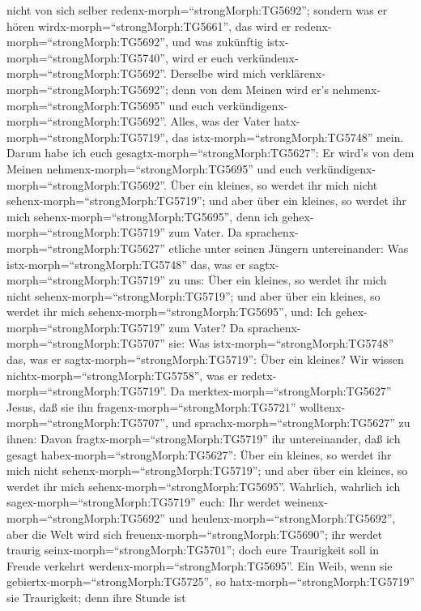 nicht von sich selber redenx-morph=``strongMorph:TG5692''; sondern was
er hören wirdx-morph=``strongMorph:TG5661'', das wird er
redenx-morph=``strongMorph:TG5692'', und was zukünftig
istx-morph=``strongMorph:TG5740'', wird er euch
verkündenx-morph=``strongMorph:TG5692''.  Derselbe wird
mich verklärenx-morph=``strongMorph:TG5692''; denn von dem Meinen wird
er's nehmenx-morph=``strongMorph:TG5695'' und euch
verkündigenx-morph=``strongMorph:TG5692''.  Alles, was der
Vater hatx-morph=``strongMorph:TG5719'', das
istx-morph=``strongMorph:TG5748'' mein. Darum habe ich euch
gesagtx-morph=``strongMorph:TG5627'': Er wird's von dem Meinen
nehmenx-morph=``strongMorph:TG5695'' und euch
verkündigenx-morph=``strongMorph:TG5692''.  Über ein
kleines, so werdet ihr mich nicht sehenx-morph=``strongMorph:TG5719'';
und aber über ein kleines, so werdet ihr mich
sehenx-morph=``strongMorph:TG5695'', denn ich
gehex-morph=``strongMorph:TG5719'' zum Vater.  Da
sprachenx-morph=``strongMorph:TG5627'' etliche unter seinen Jüngern
untereinander: Was istx-morph=``strongMorph:TG5748'' das, was er
sagtx-morph=``strongMorph:TG5719'' zu uns: Über ein kleines, so werdet
ihr mich nicht sehenx-morph=``strongMorph:TG5719''; und aber über ein
kleines, so werdet ihr mich sehenx-morph=``strongMorph:TG5695'', und:
Ich gehex-morph=``strongMorph:TG5719'' zum Vater?  Da
sprachenx-morph=``strongMorph:TG5707'' sie: Was
istx-morph=``strongMorph:TG5748'' das, was er
sagtx-morph=``strongMorph:TG5719'': Über ein kleines? Wir wissen
nichtx-morph=``strongMorph:TG5758'', was er
redetx-morph=``strongMorph:TG5719''.  Da
merktex-morph=``strongMorph:TG5627'' Jesus, daß sie ihn
fragenx-morph=``strongMorph:TG5721''
wolltenx-morph=``strongMorph:TG5707'', und
sprachx-morph=``strongMorph:TG5627'' zu ihnen: Davon
fragtx-morph=``strongMorph:TG5719'' ihr untereinander, daß ich gesagt
habex-morph=``strongMorph:TG5627'': Über ein kleines, so werdet ihr mich
nicht sehenx-morph=``strongMorph:TG5719''; und aber über ein kleines, so
werdet ihr mich sehenx-morph=``strongMorph:TG5695''. 
Wahrlich, wahrlich ich sagex-morph=``strongMorph:TG5719'' euch: Ihr
werdet weinenx-morph=``strongMorph:TG5692'' und
heulenx-morph=``strongMorph:TG5692'', aber die Welt wird sich
freuenx-morph=``strongMorph:TG5690''; ihr werdet traurig
seinx-morph=``strongMorph:TG5701''; doch eure Traurigkeit soll in Freude
verkehrt werdenx-morph=``strongMorph:TG5695''.  Ein Weib,
wenn sie gebiertx-morph=``strongMorph:TG5725'', so
hatx-morph=``strongMorph:TG5719'' sie Traurigkeit; denn ihre Stunde ist
